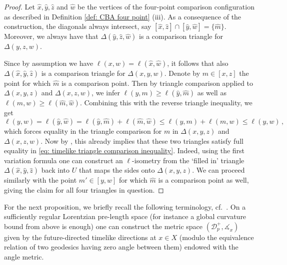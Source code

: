 \documentclass[hidelinks,12pt,a4paper]{article}
\numberwithin{equation}{section}
\theoremstyle{plain}
\theoremstyle{definition}
\newcommand{\hx}{\hat{x}}
\newcommand{\hy}{\hat{y}}
\newcommand{\hz}{\hat{z}}
\newcommand{\hhm}{\hat{m}}
\newcommand{\hw}{\hat{w}}
\newcommand{\ma}{\ensuremath{\measuredangle}}
\begin{document}
\begin{proof}
Let $\hx, \hy ,\hz$ and $\hw$ be the vertices of the four-point comparison configuration as described in Definition \ref{def: CBA four point} (iii). 
As a consequence of the construction, the diagonals always intersect, say $[\hx, \hz] \cap [\hy, \hw] = \{ \hhm \}$. 
Moreover, we always have that $\Delta(\hy,\hz,\hw)$ is a comparison triangle for $\Delta(y,z,w)$. 

Since by assumption we have $\ell(x,w)=\ell(\hx,\hw)$, it follows that also $\Delta(\hx, \hy, \hz)$ is a comparison triangle for $\Delta(x,y,w)$. 
Denote by $m \in [x,z]$ the point for which $\hhm$ is a comparison point. 
Then by triangle comparison applied to $\Delta(x,y,z)$ and $\Delta(x,z,w)$, we infer $\ell(y,m) \geq \ell(\hy,\hhm)$ as well as $\ell(m,w) \geq \ell(\hhm,\hw)$. 
Combining this with the reverse triangle inequality, we get 
\begin{equation}
\label{eq: rigidity four-point ptolemy}
\ell(y,w) = \ell(\hy,\hw) = \ell(\hy,\hhm) + \ell(\hhm,\hw) \leq \ell(y,m) + \ell(m,w) \leq \ell(y,w) \, , 
\end{equation}
which forces equality in the triangle comparison for $m$ in $\Delta(x,y,z)$ and $\Delta(x,z,w)$. 
Now by \cite[Proposition 4.1]{BBCGRR26+}, this already implies that these two triangles satisfy full equality in \eqref{eq: timelike triangle comparison inequality}. 
Indeed, using the first variation formula \cite[Theorem 3.6]{BBCGRR26+} one can construct an $\ell$-isometry from the `filled in' triangle $\Delta(\hx,\hy,\hz)$ back into $U$ that maps the sides onto $\Delta(x,y,z)$.
We can proceed similarly with the point $m' \in [y,w]$ for which $\hhm$ is a comparison point as well, giving the claim for all four triangles in question.
\end{proof}

For the next proposition, we briefly recall the following terminology, cf.\ \cite[Definition 3.6]{BS23}.
On a sufficiently regular Lorentzian pre-length space (for instance a global curvature bound from above is enough) one can construct the metric space $(\mathcal{D}_p^+, \ma_x)$ given by the future-directed timelike directions at $x \in X$ (modulo the equivalence relation of two geodesics having zero angle between them) endowed with the angle metric.
\end{document}
